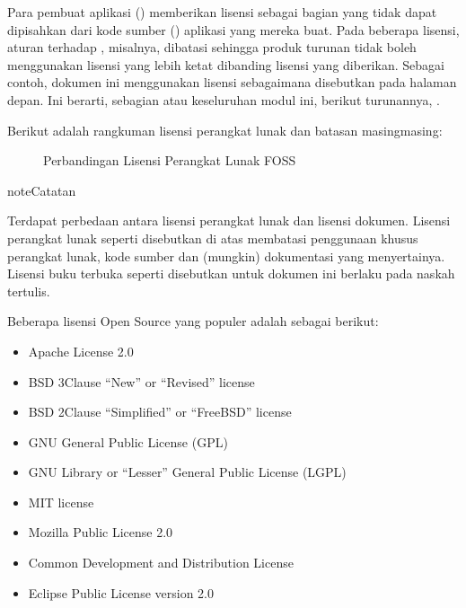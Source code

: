 \documentclass[letterpaper,10pt,english]{sphinxmanual}
\begin{document}
Para pembuat aplikasi () memberikan lisensi sebagai bagian yang tidak dapat dipisahkan dari kode sumber () aplikasi yang mereka buat. Pada beberapa lisensi, aturan terhadap , misalnya, dibatasi sehingga produk turunan tidak boleh menggunakan lisensi yang lebih ketat dibanding lisensi yang diberikan. Sebagai contoh, dokumen ini menggunakan lisensi  sebagaimana disebutkan pada halaman depan. Ini berarti, sebagian atau keseluruhan modul ini, berikut turunannya, .

Berikut adalah rangkuman lisensi perangkat lunak dan batasan masing\sphinxhyphen{}masing:

\begin{figure}[htbp]
\centering
\capstart

\noindent{}
\caption{Perbandingan Lisensi Perangkat Lunak FOSS}\label{\detokenize{sesi1/fossgis:licenses}}\end{figure}

\begin{sphinxadmonition}{note}{Catatan}

Terdapat perbedaan antara lisensi perangkat lunak dan lisensi dokumen. Lisensi perangkat lunak seperti disebutkan di atas membatasi penggunaan khusus perangkat lunak, kode sumber dan (mungkin) dokumentasi yang menyertainya. Lisensi buku terbuka seperti disebutkan untuk dokumen ini berlaku pada naskah tertulis.
\end{sphinxadmonition}

Beberapa lisensi Open Source yang populer adalah sebagai berikut:
\begin{itemize}
\item {} 
Apache License 2.0

\item {} 
BSD 3\sphinxhyphen{}Clause “New” or “Revised” license

\item {} 
BSD 2\sphinxhyphen{}Clause “Simplified” or “FreeBSD” license

\item {} 
GNU General Public License (GPL)

\item {} 
GNU Library or “Lesser” General Public License (LGPL)

\item {} 
MIT license

\item {} 
Mozilla Public License 2.0

\item {} 
Common Development and Distribution License

\item {} 
Eclipse Public License version 2.0

\end{itemize}
\end{document}
